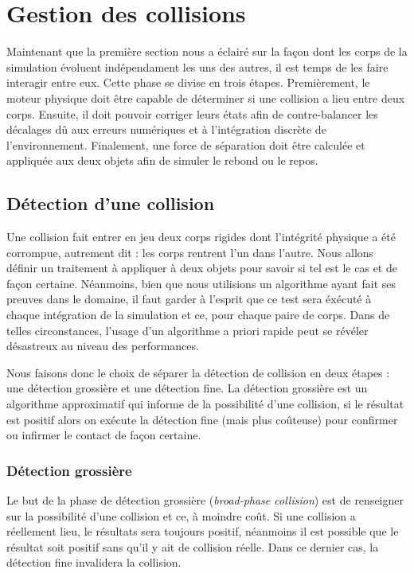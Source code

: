 \section{Gestion des collisions}

Maintenant que la première section nous a éclairé sur la façon dont les corps de la simulation évoluent indépendament les uns des autres, il est temps de les faire interagir entre eux. Cette phase se divise en trois étapes. Premièrement, le moteur physique doit être capable de déterminer si une collision a lieu entre deux corps. Ensuite, il doit pouvoir corriger leurs états afin de contre-balancer les décalages dû aux erreurs numériques et à l'intégration discrète de l'environnement. Finalement, une force de séparation doit être calculée et appliquée aux deux objets afin de simuler le rebond ou le repos.

\subsection{Détection d'une collision}

Une collision fait entrer en jeu deux corps rigides dont l'intégrité physique a été corrompue, autrement dit : les corps rentrent l'un dans l'autre. Nous allons définir un traitement à appliquer à deux objets pour savoir si tel est le cas et de façon certaine. Néanmoins, bien que nous utilisions un algorithme ayant fait ses preuves dans le domaine, il faut garder à l'esprit que ce test sera éxécuté à chaque intégration de la simulation et ce, pour chaque paire de corps. Dans de telles circonstances, l'usage d'un algorithme a priori rapide peut se révéler désastreux au niveau des performances.

Nous faisons donc le choix de séparer la détection de collision en deux étapes : une détection grossière et une détection fine. La détection grossière est un algorithme approximatif qui informe de la possibilité d'une collision, si le résultat est positif alors on exécute la détection fine (mais plus coûteuse) pour confirmer ou infirmer le contact de façon certaine.

\subsubsection{Détection grossière}

Le but de la phase de détection grossière (\textit{broad-phase collision}) est de renseigner sur la possibilité d'une collision et ce, à moindre coût. Si une collision a réellement lieu, le résultats sera toujours positif, néanmoins il est possible que le résultat soit positif sans qu'il y ait de collision réelle. Dans ce dernier cas, la détection fine invalidera la collision.


